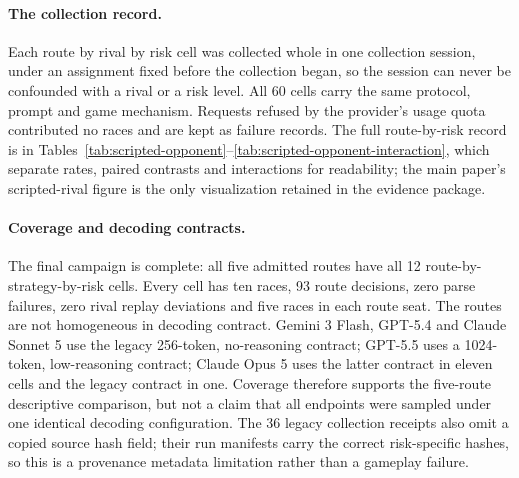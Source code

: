 \documentclass{article}
\begin{document}
\paragraph{The collection record.} Each route by rival by risk cell was
collected whole in one collection session, under an assignment fixed before the
collection began, so the session can never be confounded with a rival or a
risk level. All 60 cells carry the same protocol, prompt and game mechanism.
Requests refused by the provider's usage quota contributed no races and are
kept as failure records. The full route-by-risk record is in
Tables~\ref{tab:scripted-opponent}--\ref{tab:scripted-opponent-interaction},
which separate rates, paired contrasts and interactions for readability; the
main paper's scripted-rival figure is the only visualization retained in the
evidence package.

\paragraph{Coverage and decoding contracts.} The final campaign is complete:
all five admitted routes have all 12 route-by-strategy-by-risk cells. Every
cell has ten races, 93 route decisions, zero parse failures, zero rival replay
deviations and five races in each route seat. The routes are not homogeneous
in decoding contract. Gemini 3 Flash, GPT-5.4 and Claude Sonnet 5 use the
legacy 256-token, no-reasoning contract; GPT-5.5 uses a 1024-token,
low-reasoning contract; Claude Opus 5 uses the latter contract in eleven cells
and the legacy contract in one. Coverage
therefore supports the five-route descriptive comparison, but not a claim
that all endpoints were sampled under one identical decoding configuration.
The 36 legacy collection receipts also omit a copied source hash field; their
run manifests carry the correct risk-specific hashes, so this is a provenance
metadata limitation rather than a gameplay failure.
\end{document}
